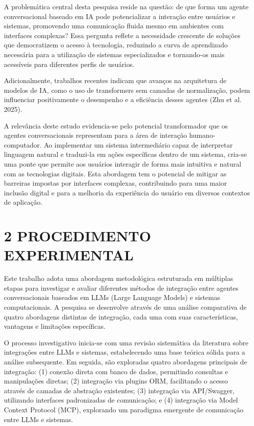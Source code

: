 \documentclass[
]{article}
\begin{document}
A problemática central desta pesquisa reside na questão: de que forma um
agente conversacional baseado em IA pode potencializar a interação entre
usuários e sistemas, promovendo uma comunicação fluida mesmo em
ambientes com interfaces complexas? Essa pergunta reflete a necessidade
crescente de soluções que democratizem o acesso à tecnologia, reduzindo
a curva de aprendizado necessária para a utilização de sistemas
especializados e tornando-os mais acessíveis para diferentes perfis de
usuários.

Adicionalmente, trabalhos recentes indicam que avanços na arquitetura de
modelos de IA, como o uso de transformers sem camadas de normalização,
podem influenciar positivamente o desempenho e a eficiência desses
agentes (Zhu et al. 2025).

A relevância deste estudo evidencia-se pelo potencial transformador que
os agentes conversacionais representam para a área de interação
humano-computador. Ao implementar um sistema intermediário capaz de
interpretar linguagem natural e traduzi-la em ações específicas dentro
de um sistema, cria-se uma ponte que permite aos usuários interagir de
forma mais intuitiva e natural com as tecnologias digitais. Esta
abordagem tem o potencial de mitigar as barreiras impostas por
interfaces complexas, contribuindo para uma maior inclusão digital e
para a melhoria da experiência do usuário em diversos contextos de
aplicação.

\section{2 PROCEDIMENTO EXPERIMENTAL}\label{procedimento-experimental}

Este trabalho adota uma abordagem metodológica estruturada em múltiplas
etapas para investigar e avaliar diferentes métodos de integração entre
agentes conversacionais baseados em LLMs (Large Language Models) e
sistemas computacionais. A pesquisa se desenvolve através de uma análise
comparativa de quatro abordagens distintas de integração, cada uma com
suas características, vantagens e limitações específicas.

O processo investigativo inicia-se com uma revisão sistemática da
literatura sobre integrações entre LLMs e sistemas, estabelecendo uma
base teórica sólida para a análise subsequente. Em seguida, são
exploradas quatro abordagens principais de integração: (1) conexão
direta com banco de dados, permitindo consultas e manipulações diretas;
(2) integração via plugins ORM, facilitando o acesso através de camadas
de abstração existentes; (3) integração via API/Swagger, utilizando
interfaces padronizadas de comunicação; e (4) integração via Model
Context Protocol (MCP), explorando um paradigma emergente de comunicação
entre LLMs e sistemas.
\end{document}
